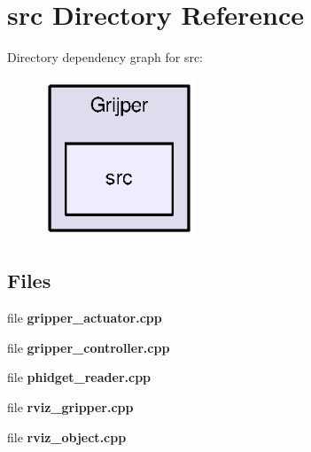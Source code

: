 \section{src Directory Reference}
\label{dir_5dd3550f8d5b93db4b67d183db32d82f}
Directory dependency graph for src\-:
\nopagebreak
\begin{figure}[H]
\begin{center}
\leavevmode
\includegraphics[width=130pt]{dir_5dd3550f8d5b93db4b67d183db32d82f_dep}
\end{center}
\end{figure}
\subsection*{Files}
\begin{DoxyCompactItemize}
\item 
file {\bf gripper\-\_\-actuator.\-cpp}
\item 
file {\bf gripper\-\_\-controller.\-cpp}
\item 
file {\bf phidget\-\_\-reader.\-cpp}
\item 
file {\bf rviz\-\_\-gripper.\-cpp}
\item 
file {\bf rviz\-\_\-object.\-cpp}
\end{DoxyCompactItemize}

